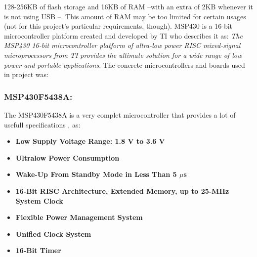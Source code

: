 			128-256KB of flash storage and 16KB	of RAM --with an extra of 2KB whenever it is not using USB 
			\cite[p. 2]{msp430f6638ds}--. This amount of RAM may be too limited for certain usages (not for 
			this project's particular requirements, though).
		\label{ssec:MSP430}
		MSP430 is a 16-bit microcontroller platform created and developed by TI who describes it as: \emph{The MSP430 16-bit microcontroller platform of ultra-low power RISC mixed-signal microprocessors from TI provides the ultimate solution for a wide range of low power and portable applications}. The concrete microcontrollers and boards used in project was:


		\subsubsection{MSP430F5438A:}
		\label{it:MSP430F5438A}
		The MSP430F5438A is a very complet microcontroller that provides a lot of usefull specifications \cite{5438a}, as:
		\begin{itemize}
			\item \textbf{Low Supply Voltage Range: 1.8 V to 3.6 V}
			\item \textbf{Ultralow Power Consumption}
			\item \textbf{Wake-Up From Standby Mode in Less Than 5 $\mu$s}
			\item \textbf{16-Bit RISC Architecture, Extended Memory, up to 25-MHz System Clock}
			\item \textbf{Flexible Power Management System}
			\item \textbf{Unified Clock System}
			\item \textbf{16-Bit Timer}\\
		\end{itemize}
